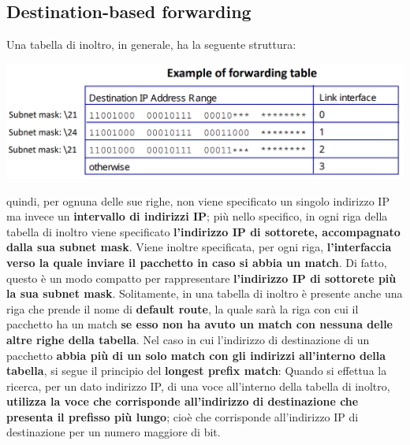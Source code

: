 \documentclass[12pt]{article}
\begin{document}
\subsection{Destination-based forwarding}
Una tabella di inoltro, in generale, ha la seguente struttura:
\begin{center}
    \includegraphics[width =0.90\linewidth]{Images/88.png}
\end{center}
quindi, per ognuna delle sue righe, non viene specificato un singolo indirizzo IP ma invece un \textbf{intervallo di indirizzi IP}; più nello specifico, in ogni riga della
tabella di inoltro viene specificato \textbf{l'indirizzo IP di sottorete, accompagnato dalla sua subnet mask}. Viene inoltre specificata, per ogni riga, \textbf{l'interfaccia verso la quale inviare il pacchetto in caso si abbia un match}.
Di fatto, questo è un modo compatto per rappresentare \textbf{l'indirizzo IP di sottorete più la sua subnet mask}.
Solitamente, in una tabella di inoltro è presente anche una riga che prende il nome di \textbf{default route}, la quale sarà la riga con cui il pacchetto ha un match \textbf{se esso non ha avuto un match con nessuna delle altre righe della tabella}.
Nel caso in cui l'indirizzo di destinazione di un pacchetto \textbf{abbia più di un solo match con gli indirizzi all'interno della tabella}, si segue il principio del \textbf{longest prefix match}: Quando si effettua la ricerca, per un dato indirizzo IP, di una
voce all'interno della tabella di inoltro, \textbf{utilizza la voce che corrisponde all'indirizzo di destinazione che presenta il prefisso più lungo}; cioè che corrisponde all'indirizzo IP di destinazione per un numero maggiore di bit.
\end{document}
